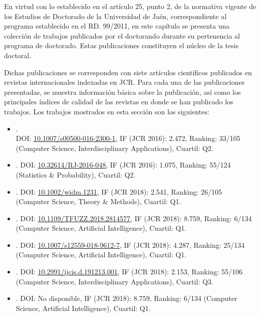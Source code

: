 \documentclass[c5paper,10pt,twoside]{book}	   	%
\newcommand{\doi}[1]{\href{https://doi.org/#1}{#1}}
\begin{document}
En virtud con lo establecido en el artículo 25, punto 2, de la normativa vigente de los Estudios de Doctorado de la Universidad de Jaén, correspondiente al programa establecido en el RD. 99/2011, en este capítulo se presenta una colección de trabajos publicados por el doctorando durante su pertenencia al programa de doctorado. Estas publicaciones constituyen el núcleo de la tesis doctoral.

Dichas publicaciones se corresponden con siete artículos científicos publicados en revistas internacionales indexadas en \ac{JCR}. Para cada una de las publicaciones presentadas, se muestra información básica sobre la publicación, así como los principales índices de calidad de las revistas en donde se han publicado los trabajos. Los trabajos mostrados en esta sección son los siguientes:

\begin{itemize}
		\item {}. \\DOI: \doi{10.1007/s00500-016-2300-1}, IF (JCR 2016): 2.472, Ranking: 33/105 (Computer Science, Interdisciplinary Applications), Cuartil: Q2.

\item {}. DOI: \doi{10.32614/RJ-2016-048}, IF (JCR 2016): 1.075, Ranking: 55/124 (Statistics \& Probability), Cuartil: Q2.

\item {}. DOI: \doi{10.1002/widm.1231}, IF (JCR 2018): 2.541, Ranking: 26/105 (Computer Science, Theory \& Methods), Cuartil: Q1.

\item \sloppy {}.  DOI: \doi{10.1109/TFUZZ.2018.2814577}, IF (JCR 2018): 8.759, Ranking: 6/134 (Computer Science, Artificial Intelligence), Cuartil: Q1.

\item {}. DOI: \doi{10.1007/s12559-018-9612-7}, IF (JCR 2018): 4.287, Ranking: 25/134 (Computer Science, Artificial Intelligence), Cuartil: Q1.

\item {}. DOI: \doi{10.2991/ijcis.d.191213.001}, IF (JCR 2018): 2.153, Ranking: 55/106 (Computer Science, Interdisciplinary Applications), Cuartil: Q3.

\item {}.   DOI: No disponible, IF (JCR 2018): 8.759, Ranking: 6/134 (Computer Science, Artificial Intelligence), Cuartil: Q1.
\end{itemize}
\end{document}
